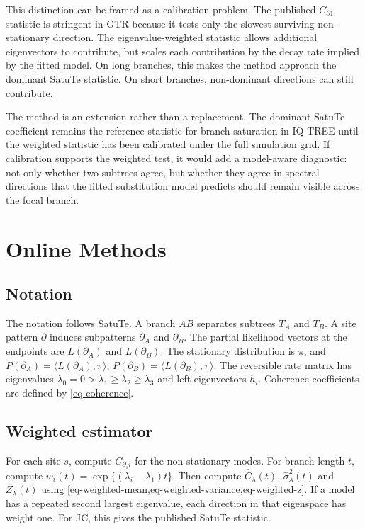 \documentclass[11pt]{article}
\begin{document}
This distinction can be framed as a calibration problem. The published \(C_{\partial 1}\) statistic is stringent in GTR because it tests only the slowest surviving non-stationary direction. The eigenvalue-weighted statistic allows additional eigenvectors to contribute, but scales each contribution by the decay rate implied by the fitted model. On long branches, this makes the method approach the dominant SatuTe statistic. On short branches, non-dominant directions can still contribute.

The method is an extension rather than a replacement. The dominant SatuTe coefficient remains the reference statistic for branch saturation in IQ-TREE until the weighted statistic has been calibrated under the full simulation grid. If calibration supports the weighted test, it would add a model-aware diagnostic: not only whether two subtrees agree, but whether they agree in spectral directions that the fitted substitution model predicts should remain visible across the focal branch.

\section*{Online Methods}

\subsection*{Notation}

The notation follows SatuTe. A branch \(AB\) separates subtrees \(T_A\) and \(T_B\). A site pattern \(\partial\) induces subpatterns \(\partial_A\) and \(\partial_B\). The partial likelihood vectors at the endpoints are \(L(\partial_A)\) and \(L(\partial_B)\). The stationary distribution is \(\pi\), and \(P(\partial_A)=\langle L(\partial_A),\pi\rangle\), \(P(\partial_B)=\langle L(\partial_B),\pi\rangle\). The reversible rate matrix has eigenvalues \(\lambda_0=0>\lambda_1\geq\lambda_2\geq\lambda_3\) and left eigenvectors \(h_i\). Coherence coefficients are defined by \cref{eq-coherence}.

\subsection*{Weighted estimator}

For each site \(s\), compute \(C_{\partial_s i}\) for the non-stationary modes. For branch length \(t\), compute \(w_i(t)=\exp\{(\lambda_i-\lambda_1)t\}\). Then compute \(\hat C_{\lambda}(t)\), \(\hat\sigma_{\lambda}^{2}(t)\) and \(Z_{\lambda}(t)\) using \cref{eq-weighted-mean,eq-weighted-variance,eq-weighted-z}. If a model has a repeated second largest eigenvalue, each direction in that eigenspace has weight one. For JC, this gives the published SatuTe statistic.
\end{document}
